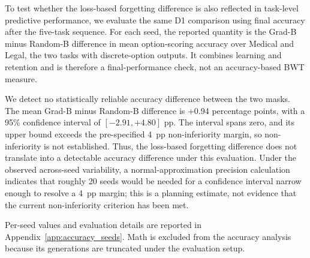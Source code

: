 
To test whether the loss-based forgetting difference is also reflected
in task-level predictive performance, we evaluate the same D1 comparison
using final accuracy after the five-task sequence. For each seed, the reported
quantity is the Grad-B minus Random-B difference in mean option-scoring accuracy
over Medical and Legal, the two tasks with discrete-option outputs. It combines
learning and retention and is therefore a final-performance check, not an
accuracy-based BWT measure.

We detect no statistically reliable accuracy difference between the two
masks. The mean Grad-B minus Random-B difference is +0.94 percentage
points, with a 95\% confidence interval of $[-2.91, +4.80]$ pp. The
interval spans zero, and its upper bound exceeds the pre-specified
4~pp non-inferiority margin, so non-inferiority is not established.
Thus, the loss-based forgetting difference does not translate into a
detectable accuracy difference under this evaluation. Under the observed
across-seed variability, a normal-approximation precision calculation indicates
that roughly 20 seeds would be needed for a confidence interval narrow enough
to resolve a 4~pp margin; this is a planning estimate, not evidence that the
current non-inferiority criterion has been met.

Per-seed values and evaluation details are reported in Appendix~\ref{app:accuracy_seeds}.
Math is excluded from the accuracy analysis because its generations are
truncated under the evaluation setup.
